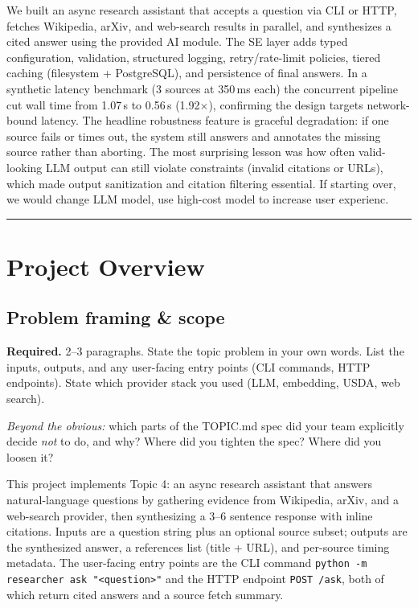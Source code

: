 \documentclass[11pt,a4paper]{article}
\begin{document}
We built an async research assistant that accepts a question via CLI or HTTP, fetches Wikipedia, arXiv, and web-search results in parallel, and synthesizes a cited answer using the provided AI module. The SE layer adds typed configuration, validation, structured logging, retry/rate-limit policies, tiered caching (filesystem + PostgreSQL), and persistence of final answers. In a synthetic latency benchmark (3 sources at 350\,ms each) the concurrent pipeline cut wall time from 1.07\,s to 0.56\,s (1.92$\times$), confirming the design targets network-bound latency. The headline robustness feature is graceful degradation: if one source fails or times out, the system still answers and annotates the missing source rather than aborting. The most surprising lesson was how often valid-looking LLM output can still violate constraints (invalid citations or URLs), which made output sanitization and citation filtering essential. If starting over, we would change LLM model, use high-cost model to increase user experienc.

\tableofcontents
\vspace{0.6em}\hrule\vspace{0.4em}

\section{Project Overview}

\subsection{Problem framing \& scope}

\begin{deliverbox}
\textbf{Required.} 2--3 paragraphs. State the topic problem in your own words. List the inputs, outputs, and any user-facing entry points (CLI commands, HTTP endpoints). State which provider stack you used (LLM, embedding, USDA, web search).
\end{deliverbox}

\begin{probebox}
\textit{Beyond the obvious:} which parts of the TOPIC.md spec did your team explicitly decide \emph{not} to do, and why? Where did you tighten the spec? Where did you loosen it?
\end{probebox}

This project implements Topic 4: an async research assistant that answers natural-language questions by gathering evidence from Wikipedia, arXiv, and a web-search provider, then synthesizing a 3--6 sentence response with inline citations. Inputs are a question string plus an optional source subset; outputs are the synthesized answer, a references list (title + URL), and per-source timing metadata. The user-facing entry points are the CLI command \texttt{python -m researcher ask "<question>"} and the HTTP endpoint \texttt{POST /ask}, both of which return cited answers and a source fetch summary.
\end{document}
